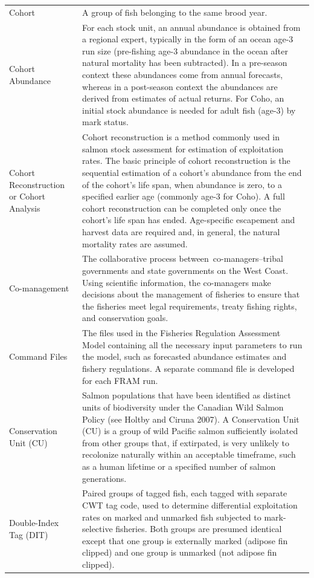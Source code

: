 \documentclass[
  letterpaper,
  DIV=11,
  numbers=noendperiod]{scrartcl}
\begin{document}
\begin{table}
\begin{tabular*}{\linewidth}{@{\extracolsep{\fill}}ll}
Cohort & A group of fish belonging to the same brood year. \\ 
Cohort Abundance & For each stock unit, an annual abundance is obtained from a regional expert, typically in the form of an ocean age-3 run size (pre-fishing age-3 abundance in the ocean after natural mortality has been subtracted). In a pre-season context these abundances come from annual forecasts, whereas in a post-season context the abundances are derived from estimates of actual returns. For Coho, an initial stock abundance is needed for adult fish (age-3) by mark status. \\ 
Cohort Reconstruction or Cohort Analysis & Cohort reconstruction is a method commonly used in salmon stock assessment for estimation of exploitation rates. The basic principle of cohort reconstruction is the sequential estimation of a cohort’s abundance from the end of the cohort’s life span, when abundance is zero, to a speciﬁed earlier age (commonly age-3 for Coho). A full cohort reconstruction can be completed only once the cohort’s life span has ended. Age-speciﬁc escapement and harvest data are required and, in general, the natural mortality rates are assumed. \\ 
Co-management & The collaborative process between co-managers–tribal governments and state governments on the West Coast. Using scientific information, the co-managers make decisions about the management of fisheries to ensure that the fisheries meet legal requirements, treaty fishing rights, and conservation goals. \\ 
Command Files & The files used in the Fisheries Regulation Assessment Model containing all the necessary input parameters to run the model, such as forecasted abundance estimates and fishery regulations. A separate command file is developed for each FRAM run. \\ 
Conservation Unit (CU) & Salmon populations that have been identified as distinct units of biodiversity under the Canadian Wild Salmon Policy (see Holtby and Ciruna 2007). A Conservation Unit (CU) is a group of wild Pacific salmon sufficiently isolated from other groups that, if extirpated, is very unlikely to recolonize naturally within an acceptable timeframe, such as a human lifetime or a specified number of salmon generations. \\ 
Double-Index Tag (DIT) & Paired groups of tagged fish, each tagged with separate CWT tag code, used to determine differential exploitation rates on marked and unmarked fish subjected to mark-selective fisheries. Both groups are presumed identical except that one group is externally marked (adipose fin clipped) and one group is unmarked (not adipose fin clipped). \\ 

\end{tabular*}
\end{table}
\end{document}
